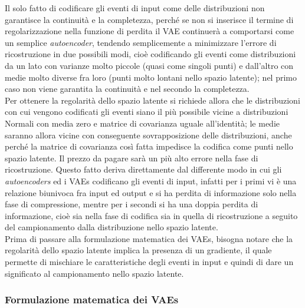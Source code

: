 Il solo fatto di codificare gli eventi di input come delle distribuzioni non garantisce la continuità e la completezza, perché se non si inserisce il termine di regolarizzazione nella funzione di perdita il VAE continuerà a comportarsi come un semplice \textit{autoencoder}, tendendo semplicemente a minimizzare l'errore di ricostruzione in due possibili modi, cioè codificando gli eventi come distribuzioni da un lato con varianze molto piccole (quasi come singoli punti) e dall'altro con medie molto diverse fra loro (punti molto lontani nello spazio latente); nel primo caso non viene garantita la continuità e nel secondo la completezza. \\ 
Per ottenere la regolarità dello spazio latente si richiede allora che le distribuzioni con cui vengono codificati gli eventi siano il più possibile vicine a distribuzioni Normali con media zero e matrice di covarianza uguale all'identità; le medie saranno allora vicine con conseguente sovrapposizione delle distribuzioni, anche perché la matrice di covarianza così fatta impedisce la codifica come punti nello spazio latente. Il prezzo da pagare sarà un più alto errore nella fase di ricostruzione. Questo fatto deriva direttamente dal differente modo in cui gli \textit{autoencoders} ed i VAEs codificano gli eventi di input, infatti per i primi vi è una relazione biunivoca fra input ed output e si ha perdita di informazione solo nella fase di compressione, mentre per i secondi si ha una doppia perdita di informazione, cioè sia nella fase di codifica sia in quella di ricostruzione a seguito del campionamento dalla distribuzione nello spazio latente.\\
Prima di passare alla formulazione matematica dei VAEs, bisogna notare che la regolarità dello spazio latente implica la presenza di un gradiente, il quale permette di mischiare le caratteristiche degli eventi in input e quindi di dare un significato al campionamento nello spazio latente. \\

\newpage

\subsubsection{Formulazione matematica dei VAEs}
\label{matematica dei VAEs}

